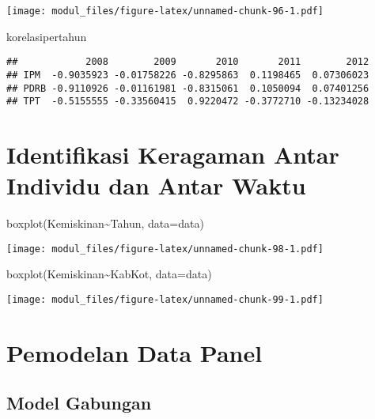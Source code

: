\documentclass[
]{book}
\newenvironment{Shaded}{\begin{snugshade}}{\end{snugshade}}
\newcommand{\AttributeTok}[1]{\textcolor[rgb]{0.77,0.63,0.00}{#1}}
\newcommand{\FunctionTok}[1]{\textcolor[rgb]{0.00,0.00,0.00}{#1}}
\newcommand{\NormalTok}[1]{#1}
\newcommand{\SpecialCharTok}[1]{\textcolor[rgb]{0.00,0.00,0.00}{#1}}
\begin{document}
\texttt{[image: modul\_files/figure-latex/unnamed-chunk-96-1.pdf]}

\begin{Shaded}
\begin{Highlighting}[]
\NormalTok{korelasipertahun}
\end{Highlighting}
\end{Shaded}

\begin{verbatim}
##            2008        2009       2010       2011        2012
## IPM  -0.9035923 -0.01758226 -0.8295863  0.1198465  0.07306023
## PDRB -0.9110926 -0.01161981 -0.8315061  0.1050094  0.07401256
## TPT  -0.5155555 -0.33560415  0.9220472 -0.3772710 -0.13234028
\end{verbatim}

\hypertarget{identifikasi-keragaman-antar-individu-dan-antar-waktu}{%
\section{Identifikasi Keragaman Antar Individu dan Antar Waktu}\label{identifikasi-keragaman-antar-individu-dan-antar-waktu}}

\begin{Shaded}
\begin{Highlighting}[]
\FunctionTok{boxplot}\NormalTok{(Kemiskinan}\SpecialCharTok{\textasciitilde{}}\NormalTok{Tahun, }\AttributeTok{data=}\NormalTok{data)}
\end{Highlighting}
\end{Shaded}

\texttt{[image: modul\_files/figure-latex/unnamed-chunk-98-1.pdf]}

\begin{Shaded}
\begin{Highlighting}[]
\FunctionTok{boxplot}\NormalTok{(Kemiskinan}\SpecialCharTok{\textasciitilde{}}\NormalTok{KabKot, }\AttributeTok{data=}\NormalTok{data)}
\end{Highlighting}
\end{Shaded}

\texttt{[image: modul\_files/figure-latex/unnamed-chunk-99-1.pdf]}

\hypertarget{pemodelan-data-panel}{%
\section{Pemodelan Data Panel}\label{pemodelan-data-panel}}

\hypertarget{model-gabungan}{%
\subsection{Model Gabungan}\label{model-gabungan}}
\end{document}
